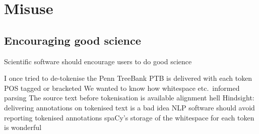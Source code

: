 \documentclass[aspectratio=169, 22pt]{beamer}
\begin{document}
\section{Misuse} %

\subsection{Encouraging good science}
\begin{frame}[plain]
	\vfill
	\begin{center}
		\Large
Scientific software should encourage users to do good science
\end{center}
	\vfill
\end{frame}

\begin{points}{I once tried to de-tokenise the Penn TreeBank}
	\p PTB is delivered with each token POS tagged or bracketed
	\p We wanted to know how whitespace etc.\ informed parsing
	\p The source text before tokenisation is available
	\p[$\Rightarrow$] alignment hell
	\vfill
	\p Hindsight: delivering annotations on tokenised text is a bad idea
	\p NLP software should avoid reporting tokenised annotations
	\p spaCy's storage of the whitespace for each token is wonderful
\end{points}
\end{document}
